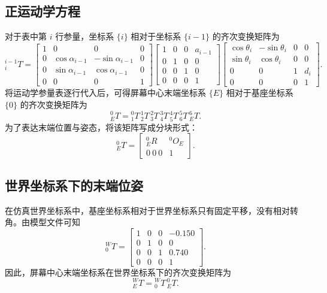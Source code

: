 \documentclass[12pt,a4paper,UTF8]{article}
\begin{document}
\subsection{正运动学方程}

对于表中第 $i$ 行参量，坐标系 $\{i\}$ 相对于坐标系 $\{i-1\}$ 的齐次变换矩阵为
\[
{}^{i-1}_{i}T=
\begin{bmatrix}
1 & 0 & 0 & 0\\
0 & \cos\alpha_{i-1} & -\sin\alpha_{i-1} & 0\\
0 & \sin\alpha_{i-1} & \cos\alpha_{i-1} & 0\\
0 & 0 & 0 & 1
\end{bmatrix}
\begin{bmatrix}
1 & 0 & 0 & a_{i-1}\\
0 & 1 & 0 & 0\\
0 & 0 & 1 & 0\\
0 & 0 & 0 & 1
\end{bmatrix}
\begin{bmatrix}
\cos\theta_i & -\sin\theta_i & 0 & 0\\
\sin\theta_i & \cos\theta_i & 0 & 0\\
0 & 0 & 1 & d_i\\
0 & 0 & 0 & 1
\end{bmatrix}.
\]
将运动学参量表逐行代入后，可得屏幕中心末端坐标系 $\{E\}$ 相对于基座坐标系 $\{0\}$ 的齐次变换矩阵为
\[
{}^{0}_{E}T
= {}^{0}_{1}T\,{}^{1}_{2}T\,{}^{2}_{3}T\,{}^{3}_{4}T\,
{}^{4}_{5}T\,{}^{5}_{6}T\,{}^{6}_{E}T.
\]
为了表达末端位置与姿态，将该矩阵写成分块形式：
\[
{}^{0}_{E}T=
\begin{bmatrix}
{}^{0}_{E}R & {}^{0}O_E\\
0\ 0\ 0 & 1
\end{bmatrix}.
\]

\subsection{世界坐标系下的末端位姿}

在仿真世界坐标系中，基座坐标系相对于世界坐标系只有固定平移，没有相对转角。由模型文件可知
\[
{}^{W}_{0}T=
\begin{bmatrix}
1 & 0 & 0 & -0.150\\
0 & 1 & 0 & 0\\
0 & 0 & 1 & 0.740\\
0 & 0 & 0 & 1
\end{bmatrix}.
\]
因此，屏幕中心末端坐标系在世界坐标系下的齐次变换矩阵为
\[
{}^{W}_{E}T={}^{W}_{0}T\,{}^{0}_{E}T.
\]
\end{document}
